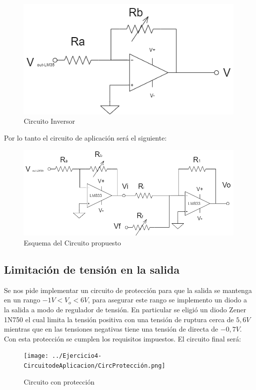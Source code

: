 \begin{figure}[H]
    \centering
    \includegraphics[scale=0.5]{../Ejercicio4-CircuitodeAplicacion/CircInversor.png}
    \caption{Circuito Inversor}
    \label{fig:my_label}
\end{figure}

Por lo tanto el circuito de aplicación será el siguiente:

\begin{figure}[H]
    \centering
    \includegraphics[scale=0.5]{../Ejercicio4-CircuitodeAplicacion/CircAplicacion.png}
    \caption{Esquema del Circuito propuesto}
    \label{fig:my_label}
\end{figure}


\subsection{Limitación de tensión en la salida}

Se nos pide implementar un circuito de protección para que la salida se mantenga en un rango $-1V < V_o < 6V$, para asegurar este rango se implemento un diodo a la salida a modo de regulador de tensión. En particular se eligió un diodo Zener 1N750 el cual limita la tensión positiva con una tensión de ruptura cerca de $5,6V$ mientras que en las tensiones negativas tiene una tensión de directa de $-0,7V$. Con esta protección se cumplen los requisitos impuestos. El circuito final será:

\begin{figure}[H]
    \centering
    \texttt{[image: ../Ejercicio4-CircuitodeAplicacion/CircProtección.png]}
    \caption{Circuito con protección}
    \label{fig:my_label}
\end{figure}



